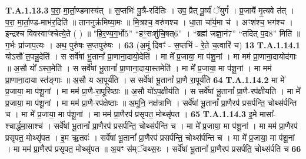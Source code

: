 \documentclass[17pt]{extarticle}
\begin{document}
                                                                  \textbf{ T.A.1.13.3} \newline
                  प॒रा॒ मा॒र्ता॒ण्डमास्य॑त् ॥ स॒प्तभिः॑ पु॒त्रै-रदि॑तिः । उप॒ प्रैत् पू॒र्व्यं॑ ॅयुगं᳚ । प्र॒जायै॑ मृ॒त्यवे त॑त् । प॒रा॒ मा॒र्ता॒ण्ड-माभ॑र॒दिति॑ ॥ ताननुक्र॑मिष्या॒मः ॥ मि॒त्रश्च॒ वरु॑णश्च । धा॒ता चा᳚र्य॒मा च॑ । अꣳश॑श्च॒ भग॑श्च । इन्द्रश्च विवस्वाꣳ॑श्चेत्ये॒ते ( ) ॥ "हि॒र॒ण्य॒ग॒र्भो{5}” “हꣳ॒॒सःशु॑चि॒षत्{6}” ।  “ब्रह्म॑ जज्ञा॒नं{7}” “तदित् प॒द{8}” मिति॑ ॥  ग॒र्भः प्रा॑जाप॒त्यः । अथ॒ पुरु॑षः स॒प्तपुरु॑षः । \textbf{ 63} \newline
                  \newline
                                                        (अ॒मूं दिवꣳ॑ - स॒प्तभि॑ - रे॒ते च॒त्वारि॑ च) \textbf{13} \newline \newline
                                \textbf{ T.A.1.14.1} \newline
                  योऽसौ॑ त॒पन्नु॒देति॑ । स सर्वे॑षां भू॒तानां᳚ प्रा॒णाना॒दायो॒देति॑ । मा मे᳚ प्र॒जाया॒ मा प॑शू॒नां । मा मम॑ प्रा॒णाना॒दायोद॑गाः ॥  अ॒सौ यो᳚ ऽस्त॒मेति॑ । स सर्वे॑षां भू॒तानां᳚ प्रा॒णाना॒दाया॒स्तमेति॑ । मा मे᳚ प्र॒जाया॒ मा प॑शू॒नां । मा मम॑ प्रा॒णाना॒दाया स्त॑ङ्गाः ॥  अ॒सौ य आ॒पूर्य॑ति । स सर्वे॑षां भू॒तानां᳚ प्रा॒णै रा॒पूर्य॑ति \textbf{ 64} \newline
                  \newline
                                                                  \textbf{ T.A.1.14.2} \newline
                  मा मे᳚ प्र॒जाया॒ मा प॑शू॒नां । मा मम॑ प्रा॒णै-रा॒पूरि॑ष्ठाः ॥ अ॒सौ यो॑ऽप॒क्षीय॑ति । स सर्वे॑षां भू॒तानां᳚ प्रा॒णै-रप॑क्षीयति । मा मे᳚ प्र॒जाया॒ मा प॑शू॒नां । मा मम॑ प्रा॒णै-रप॑क्षेष्ठाः ॥ अ॒मूनि॒ नक्ष॑त्राणि । सर्वे॑षां भू॒तानां᳚ प्रा॒णैरप॑ प्रसर्पन्ति॒ चोथ्स॑र्पन्ति च ।  मा मे᳚ प्र॒जाया॒ मा प॑शू॒नां ।  मा मम॑ प्रा॒णैरप॑ प्रसृपत॒ मोथ्सृ॑पत । \textbf{ 65} \newline
                  \newline
                                                                  \textbf{ T.A.1.14.3} \newline
                  इ॒मे मासा᳚-श्चार्द्धमा॒साश्च॑ ।  सर्वे॑षां भू॒तानां᳚ प्रा॒णैरप॑ प्रसर्पन्ति॒ चोथ्स॑र्पन्ति च । मा मे᳚ प्र॒जाया॒ मा प॑शू॒नां ।  मा मम॑ प्रा॒णैरप॑ प्रसृपत॒ मोथ्सृ॑पत । इ॒म ऋ॒तवः॑ । सर्वे॑षां भू॒तानां᳚ प्रा॒णैरप॑ प्रसर्पन्ति॒ चोथ्स॑र्पन्ति च ।  मा मे᳚ प्र॒जाया॒ मा प॑शू॒नां ।  मा मम॑ प्रा॒णैरप॑ प्रसृपत॒ मोथ्सृ॑पत ॥ अ॒यꣳ स॑म्ॅवथ्स॒रः ।  सर्वे॑षां भू॒तानां᳚ प्रा॒णैरप॑ प्रसर्पति॒ चोथ्स॑र्पति च \textbf{ 66} \newline
\end{document}
